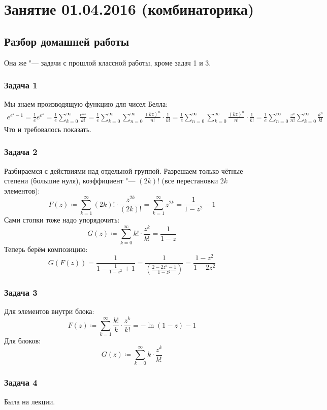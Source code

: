\chapter{Занятие 01.04.2016 (комбинаторика)}
\section{Разбор домашней работы}
Она же "--- задачи с прошлой классной работы, кроме задач 1 и 3.

\subsection{Задача 1}
	Мы знаем производящую функцию для чисел Белла:
	\begin{gather*}
		e^{e^z-1} =
		\frac1e e^{e^z} =
		\frac1e \sum_{k=0}^{\infty} \frac{e^{kz}}{k!} =
		\frac1e \sum_{k=0}^{\infty} \sum_{n=0}^{\infty} \frac{(kz)^n}{n!} \cdot \frac{1}{k!} =
		\frac1e \sum_{n=0}^{\infty} \sum_{k=0}^{\infty} \frac{(kz)^n}{n!} \cdot \frac{1}{k!} =
		\frac1e \sum_{n=0}^{\infty} \frac{z^n}{n!} \sum_{k=0}^{\infty} \frac{k^n}{k!}
	\end{gather*}
	Что и требовалось показать.

\subsection{Задача 2}
	Разбираемся с действиями над отдельной группой.
	Разрешаем только чётные степени (большие нуля), коэффициент "--- $(2k)!$ (все перестановки $2k$ элементов):
	\[
		F(z) \coloneq \sum_{k=1}^\infty (2k)! \cdot \frac{z^{2k}}{(2k)!} = \sum_{k=1}^\infty z^{2k} = \frac{1}{1-z^2} - 1
	\]
	Сами стопки тоже надо упорядочить:
	\[
		G(z) \coloneq \sum_{k=0}^\infty k! \cdot \frac{z^k}{k!} = \frac{1}{1 - z}
	\]
	Теперь берём композицию:
	\[
		G(F(z)) = \frac{1}{1-\frac{1}{1-z^2}+1} = \frac{1}{\left(\frac{2-2z^2-1}{1-z^2}\right)} = \frac{1-z^2}{1-2z^2}
	\]

\subsection{Задача 3}
	Для элементов внутри блока:
	\[
		F(z) \coloneq \sum_{k=1}^\infty \frac{k!}{k} \cdot \frac{z^k}{k!} = -\ln(1-z) - 1
	\]
	Для блоков:
	\[
		G(z) \coloneq \sum_{k=0}^\infty k \cdot \frac{z^k}{k!}
	\]

\subsection{Задача 4}
	Была на лекции.

